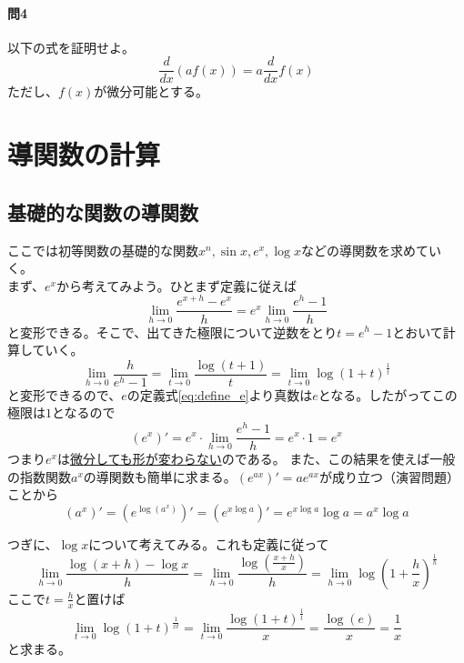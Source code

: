\documentclass[a4j,dvipdfmx]{jsarticle}
\begin{document}
            \paragraph{問4}以下の式を証明せよ。
            \begin{equation*}
                \frac{d}{dx}(af(x))=a\frac{d}{dx}f(x)
            \end{equation*}
            ただし、$f(x)$が微分可能とする。
        \clearpage
        \section{導関数の計算}
            \subsection{基礎的な関数の導関数}
                \noindent
                ここでは初等関数の基礎的な関数$x^n,\sin x,e^x,\log x$などの導関数を求めていく。\\

                まず、$e^x$から考えてみよう。ひとまず定義に従えば
                \begin{equation}
                    \lim_{h\to 0}\frac{e^{x+h}-e^{x}}{h}=e^x\lim_{h\to 0}\frac{e^h-1}{h}
                \end{equation}
                と変形できる。そこで、出てきた極限について逆数をとり$t=e^h-1$とおいて計算していく。
                \begin{equation}
                    \lim_{h\to 0}\frac{h}{e^h-1}=\lim_{t\to 0}\frac{\log(t+1)}{t}=\lim_{t\to 0}\log(1+t)^\frac{1}{t}
                \end{equation}
                と変形できるので、$e$の定義式\eqref{eq:define_e}より真数は$e$となる。したがってこの極限は$1$となるので
                \begin{equation}
                    (e^x)'=e^x \cdot \lim_{h\to 0}\frac{e^h-1}{h}=e^x \cdot 1 =e^x
                \end{equation}
                つまり$e^x$は\underline{微分しても形が変わらない}のである。
                また、この結果を使えば一般の指数関数$a^x$の導関数も簡単に求まる。$(e^{ax})'=ae^{ax}$が成り立つ（演習問題）ことから
                \begin{equation}
                    (a^x)'=(e^{\log(a^x)})'=(e^{x\log a})'=e^{x\log a}\log a=a^x\log a
                \end{equation}

                つぎに、$\log x$について考えてみる。これも定義に従って
                \begin{equation}
                    \lim_{h\to 0}\frac{\log(x+h)-\log x}{h}=\lim_{h\to 0}\frac{\log\left(\frac{x+h}{x}\right)}{h}=\lim_{h\to 0}\log\left(1+\frac{h}{x}\right)^\frac{1}{h}
                \end{equation}
                ここで$t=\frac{h}{x}$と置けば
                \begin{equation}
                    \lim_{t \to 0}\log(1+t)^\frac{1}{xt}=\lim_{t\to 0}\frac{\log(1+t)^\frac{1}{t}}{x}=\frac{\log(e)}{x}=\frac{1}{x}
                \end{equation}
                と求まる。
\end{document}
